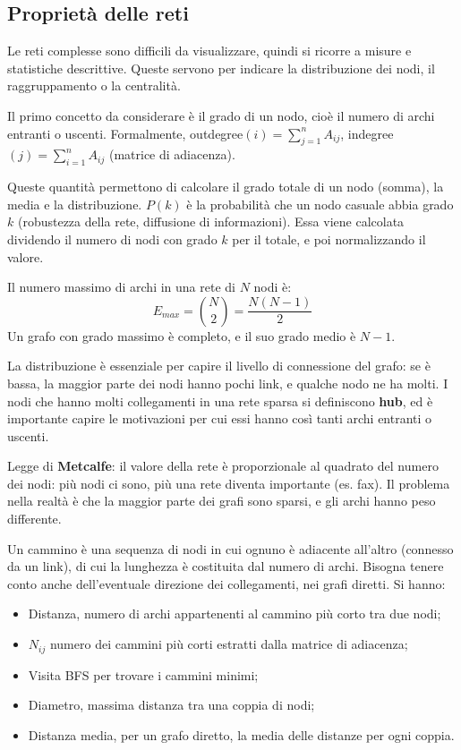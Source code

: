 \subsection{Proprietà delle reti}
Le reti complesse sono difficili da visualizzare, quindi si ricorre a misure e statistiche descrittive. Queste servono per indicare la distribuzione dei nodi, il raggruppamento o la centralità.

Il primo concetto da considerare è il grado di un nodo, cioè il numero di archi entranti o uscenti. Formalmente, outdegree$(i) = \sum_{j=1}^{n} A_{ij}$, indegree$(j) = \sum_{i=1}^{n} A_{ij}$ (matrice di adiacenza).

Queste quantità permettono di calcolare il grado totale di un nodo (somma), la media e la distribuzione. $P(k)$ è la probabilità che un nodo casuale abbia grado $k$ (robustezza della rete, diffusione di informazioni). Essa viene calcolata dividendo il numero di nodi con grado $k$ per il totale, e poi normalizzando il valore.

Il numero massimo di archi in una rete di $N$ nodi è:
$$E_{max} = \binom{N}{2} = \frac{N(N - 1)}{2}$$
Un grafo con grado massimo è completo, e il suo grado medio è $N - 1$.

La distribuzione è essenziale per capire il livello di connessione del grafo: se è bassa, la maggior parte dei nodi hanno pochi link, e qualche nodo ne ha molti. I nodi che hanno molti collegamenti in una rete sparsa si definiscono \textbf{hub}, ed è importante capire le motivazioni per cui essi hanno così tanti archi entranti o uscenti.

Legge di \textbf{Metcalfe}: il valore della rete è proporzionale al quadrato del numero dei nodi: più nodi ci sono, più una rete diventa importante (es. fax). Il problema nella realtà è che la maggior parte dei grafi sono sparsi, e gli archi hanno peso differente.

Un cammino è una sequenza di nodi in cui ognuno è adiacente all'altro (connesso da un link), di cui la lunghezza è costituita dal numero di archi. Bisogna tenere conto anche dell'eventuale direzione dei collegamenti, nei grafi diretti. Si hanno:
\begin{itemize}
	\item Distanza, numero di archi appartenenti al cammino più corto tra due nodi;
	\item $N_{ij}$ numero dei cammini più corti estratti dalla matrice di adiacenza;
	\item Visita BFS per trovare i cammini minimi;
	\item Diametro, massima distanza tra una coppia di nodi;
	\item Distanza media, per un grafo diretto, la media delle distanze per ogni coppia.
\end{itemize}

